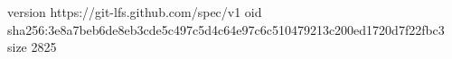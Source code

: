 version https://git-lfs.github.com/spec/v1
oid sha256:3e8a7beb6de8eb3cde5c497c5d4c64e97c6c510479213c200ed1720d7f22fbc3
size 2825

